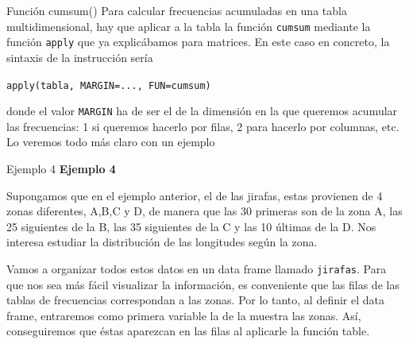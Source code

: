 \documentclass[
  ignorenonframetext,
]{beamer}
\begin{document}
\begin{frame}[fragile]{Función cumsum()}
\label{funciuxf3n-cumsum-5}
Para calcular frecuencias acumuladas en una tabla multidimensional, hay
que aplicar a la tabla la función \texttt{cumsum} mediante la función
\texttt{apply} que ya explicábamos para matrices. En este caso en
concreto, la sintaxis de la instrucción sería

\texttt{apply(tabla,\ MARGIN=...,\ FUN=cumsum)}

donde el valor \texttt{MARGIN} ha de ser el de la dimensión en la que
queremos acumular las frecuencias: 1 si queremos hacerlo por filas, 2
para hacerlo por columnas, etc. Lo veremos todo más claro con un ejemplo
\end{frame}

\begin{frame}[fragile]{Ejemplo 4}
\label{ejemplo-4}
\textbf{Ejemplo 4}

Supongamos que en el ejemplo anterior, el de las jirafas, estas
provienen de 4 zonas diferentes, A,B,C y D, de manera que las 30
primeras son de la zona A, las 25 siguientes de la B, las 35 siguientes
de la C y las 10 últimas de la D. Nos interesa estudiar la distribución
de las longitudes según la zona.

Vamos a organizar todos estos datos en un data frame llamado
\texttt{jirafas}. Para que nos sea más fácil visualizar la información,
es conveniente que las filas de las tablas de frecuencias correspondan a
las zonas. Por lo tanto, al definir el data frame, entraremos como
primera variable la de la muestra las zonas. Así, conseguiremos que
éstas aparezcan en las filas al aplicarle la función table.
\end{frame}
\end{document}

